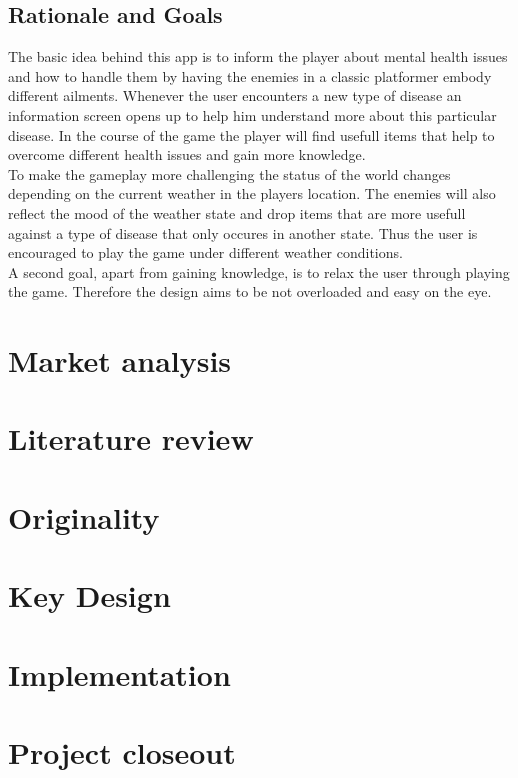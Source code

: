 \documentclass{sigchi}
\begin{document}
\subsection{Rationale and Goals}
The basic idea behind this app is to inform the player about mental health issues and how to handle them by having the enemies in a classic platformer embody different ailments. Whenever the user encounters a new type of disease an information screen opens up to help him understand more about this particular disease. In the course of the game the player will find usefull items that help to overcome different health issues and gain more knowledge.\\
To make the gameplay more challenging the status of the world changes depending on the current weather in the players location. The enemies will also reflect the mood of the weather state and drop items that are more usefull against a type of disease that only occures in another state. Thus the user is encouraged to play the game under different weather conditions.\\
A second goal, apart from gaining knowledge, is to relax the user through playing the game. Therefore the design aims to be not overloaded and easy on the eye.

\section{Market analysis}
\section{Literature review}
\section{Originality}
\section{Key Design}
\section{Implementation}
\section{Project closeout}
\end{document}
